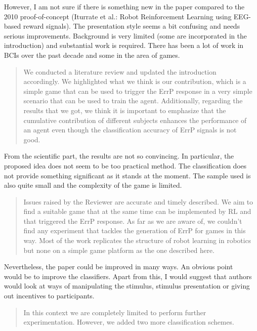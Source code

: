 \documentclass[journal,onecolumn,12pt]{IEEEtran}
\begin{document}
However, I am not sure if there is something new in the paper compared to the 2010 proof-of-concept (Iturrate et al.: Robot Reinforcement Learning using EEG-based reward signals). The presentation style seems a bit confusing and needs serious improvements. Background is very limited (some are incorporated in the introduction) and substantial work is required. There has been a lot of work in BCIs over the past decade and some in the area of games.

\begin{quotation}
{\color{blue}
We conducted a literature review and updated the introduction accordingly.  We highlighted what we think is our contribution, which is a simple game that can be used to trigger the ErrP response in a very simple scenario that can be used to train the agent.  Additionally, regarding the results that we got, we think it is important to emphasize that the cumulative contribution of different subjects enhances the performance of an agent even though the classification accuracy of ErrP signals is not good.
}
\end{quotation}


From the scientific part, the results are not so convincing. In particular, the proposed idea does not seem to be too practical method. The classification does not provide something significant as it stands at the moment. The sample used is also quite small and the complexity of the game is limited.

\begin{quotation}
{\color{blue}
Issues raised by the Reviewer are accurate and timely described.  We aim to find a suitable game that at the same time can be implemented by RL and that triggered the ErrP response.  As far as we are aware of, we couldn't find any experiment that tackles the generation of ErrP for games in this way.  Most of the work replicates the structure of robot learning in robotics but none on a simple game platform as the one described here.
}
\end{quotation}


Nevertheless, the paper could be improved in many ways. An obvious point would be to improve the classifiers. Apart from this, I would suggest that authors would look at ways of manipulating the stimulus, stimulus presentation or giving out incentives to participants.

\begin{quotation}
{\color{blue}
In this context we are completely limited to perform further experimentation.  However, we added two more classification schemes.
}
\end{quotation}
\end{document}
